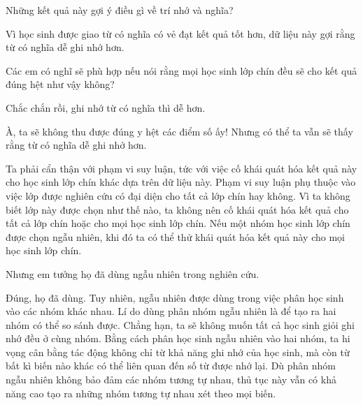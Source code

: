 {\begin{scriptlist}
      \item [Giáo viên:] Những kết quả này gợi ý điều gì về trí nhớ và nghĩa?
      
      \item [Học sinh N:] Vì học sinh được giao từ có nghĩa có vẻ đạt kết quả tốt hơn, dữ liệu này gợi rằng từ có nghĩa dễ ghi nhớ hơn.\vspace{\baselineskip}
      
      \item [Giáo viên:] Các em có nghĩ sẽ phù hợp nếu nói rằng mọi học sinh lớp chín đều sẽ cho kết quả đúng hệt như vậy không?
      
      \item [Học sinh O:] Chắc chắn rồi, ghi nhớ từ có nghĩa thì dễ hơn.
      
      \item [Học sinh P:] À, ta sẽ không thu được đúng y hệt các điểm số ấy! Nhưng có thể ta vẫn sẽ thấy rằng từ có nghĩa dễ ghi nhớ hơn.
      
      \item [Giáo viên:] Ta phải cẩn thận với phạm vi suy luận, tức với việc cố khái quát hóa kết quả này cho học sinh lớp chín khác dựa trên dữ liệu này. Phạm vi suy luận phụ thuộc vào việc lớp được nghiên cứu có đại diện cho tất cả lớp chín hay không. Vì ta không biết lớp này được chọn như thế nào, ta không nên cố khái quát hóa kết quả cho tất cả lớp chín hoặc cho mọi học sinh lớp chín. Nếu một nhóm học sinh lớp chín được chọn ngẫu nhiên, khi đó ta có thể thử khái quát hóa kết quả này cho mọi học sinh lớp chín.\vspace{\baselineskip}
      
      \item [Học sinh Q:] Nhưng em tưởng họ đã dùng ngẫu nhiên trong nghiên cứu.
      
      \item [Giáo viên:] Đúng, họ đã dùng. Tuy nhiên, ngẫu nhiên được dùng trong việc phân học sinh vào các nhóm khác nhau. Lí do dùng phân nhóm ngẫu nhiên là để tạo ra hai nhóm có thể so sánh được. Chẳng hạn, ta sẽ không muốn tất cả học sinh giỏi ghi nhớ đều ở cùng nhóm. Bằng cách phân học sinh ngẫu nhiên vào hai nhóm, ta hi vọng cân bằng tác động không chỉ từ khả năng ghi nhớ của học sinh, mà còn từ bất kì biến nào khác có thể liên quan đến số từ được nhớ lại. Dù phân nhóm ngẫu nhiên không bảo đảm các nhóm tương tự nhau, thủ tục này vẫn có khả năng cao tạo ra những nhóm tương tự nhau xét theo mọi biến.
    \end{scriptlist}\vspace{2\baselineskip}

}
